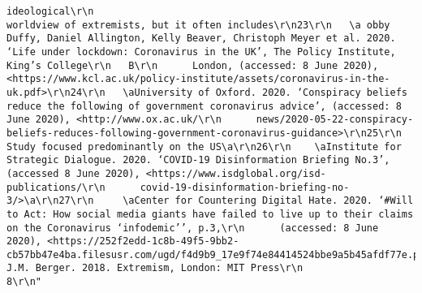 \documentclass[
]{book}
\begin{document}
\begin{verbatim}
ideological\r\n                                                                                    worldview of extremists, but it often includes\r\n23\r\n   \a obby Duffy, Daniel Allington, Kelly Beaver, Christoph Meyer et al. 2020. ‘Life under lockdown: Coronavirus in the UK’, The Policy Institute, King’s College\r\n   B\r\n      London, (accessed: 8 June 2020), <https://www.kcl.ac.uk/policy-institute/assets/coronavirus-in-the-uk.pdf>\r\n24\r\n   \aUniversity of Oxford. 2020. ‘Conspiracy beliefs reduce the following of government coronavirus advice’, (accessed: 8 June 2020), <http://www.ox.ac.uk/\r\n      news/2020-05-22-conspiracy-beliefs-reduces-following-government-coronavirus-guidance>\r\n25\r\n    Study focused predominantly on the US\a\r\n26\r\n    \aInstitute for Strategic Dialogue. 2020. ‘COVID-19 Disinformation Briefing No.3’, (accessed 8 June 2020), <https://www.isdglobal.org/isd-publications/\r\n      covid-19-disinformation-briefing-no-3/>\a\r\n27\r\n     \aCenter for Countering Digital Hate. 2020. ‘#Will to Act: How social media giants have failed to live up to their claims on the Coronavirus ‘infodemic’’, p.3,\r\n      (accessed: 8 June 2020), <https://252f2edd-1c8b-49f5-9bb2-cb57bb47e4ba.filesusr.com/ugd/f4d9b9_17e9f74e84414524bbe9a5b45afdf77e.pdf>\r\n28\r\n      J.M. Berger. 2018. Extremism, London: MIT Press\r\n                                                                                 8\r\n"                                                                                                                                                                                                                                                                                                                                                                                                                                                                                                                                                                                                                                                                                                                                                                                                                                                                                                                                                                                                                                                                                                                                                                                                                                                                                                      

\end{verbatim}
\end{document}
